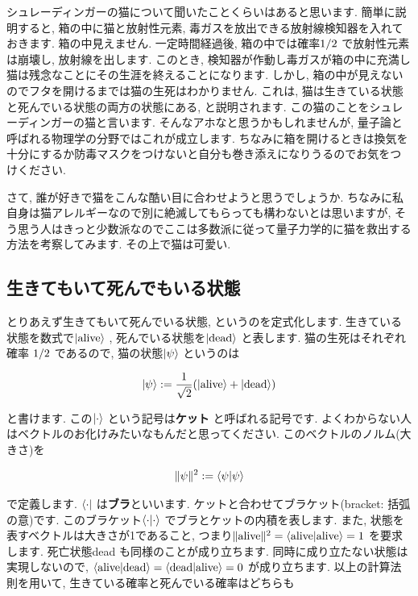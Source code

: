 \documentclass[10pt,b5jsbook,dvips,dvipdfmx,openany]{jsbook}
\theoremstyle{definition}
\begin{document}
    シュレーディンガーの猫について聞いたことくらいはあると思います. 簡単に説明すると, 箱の中に猫と放射性元素, 毒ガスを放出できる放射線検知器を入れておきます. 箱の中見えません. 一定時間経過後, 箱の中では確率$ \mathinner{1/2} $ で放射性元素は崩壊し, 放射線を出します. このとき, 検知器が作動し毒ガスが箱の中に充満し猫は残念なことにその生涯を終えることになります. しかし, 箱の中が見えないのでフタを開けるまでは猫の生死はわかりません. これは, 猫は生きている状態と死んでいる状態の両方の状態にある, と説明されます. この猫のことをシュレーディンガーの猫と言います. そんなアホなと思うかもしれませんが,  量子論と呼ばれる物理学の分野ではこれが成立します. ちなみに箱を開けるときは換気を十分にするか防毒マスクをつけないと自分も巻き添えになりうるのでお気をつけください.

    さて, 誰が好きで猫をこんな酷い目に合わせようと思うでしょうか. ちなみに私自身は猫アレルギーなので別に絶滅してもらっても構わないとは思いますが, そう思う人はきっと少数派なのでここは多数派に従って量子力学的に猫を救出する方法を考察してみます. その上で猫は可愛い.

    \subsection{生きてもいて死んでもいる状態}
    とりあえず生きてもいて死んでいる状態, というのを定式化します. 生きている状態を数式で$ \mathinner{\left|{\mathrm{alive}}\right\rangle} $ , 死んでいる状態を$ \mathinner{\left|{\mathrm{dead}}\right\rangle} $ と表します. 猫の生死はそれぞれ確率 $ \mathinner{1/2} $ であるので, 猫の状態$ \mathinner{\left|{\psi}\right\rangle} $ というのは

    \[
    \mathinner{\left|{\psi}\right\rangle} := \frac{1}{\sqrt{2}}( \mathinner{\left|{\mathrm{alive}}\right\rangle}  + \mathinner{\left|{\mathrm{dead}}\right\rangle} )
    \]

    と書けます. この$ \mathinner{\left|{\cdot}\right\rangle} $ という記号は\textbf{ケット} と呼ばれる記号です. よくわからない人はベクトルのお化けみたいなもんだと思ってください. このベクトルのノルム(大きさ)を

    \[
    \| \psi \|^2 := \mathinner{\left\langle{\psi | \psi}\right\rangle}
    \]

    で定義します. $ \mathinner{\left\langle{\cdot}\right|} $ は\textbf{ブラ}といいます. ケットと合わせてブラケット(bracket: 括弧の意)です. このブラケット$ \mathinner{\left\langle{\cdot | \cdot }\right\rangle} $ でブラとケットの内積を表します. また, 状態を表すベクトルは大きさが1であること, つまり$ \|\mathrm{alive}\|^2 = \mathinner{\left\langle{\mathrm{alive}|\mathrm{alive} }\right\rangle} = 1 $ を要求します. 死亡状態dead も同様のことが成り立ちます. 同時に成り立たない状態は実現しないので, $ \mathinner{\left\langle{\mathrm{alive}|\mathrm{dead} }\right\rangle} = \mathinner{\left\langle{\mathrm{dead}|\mathrm{alive} }\right\rangle}  =0$ が成り立ちます. 以上の計算法則を用いて, 生きている確率と死んでいる確率はどちらも
\end{document}
